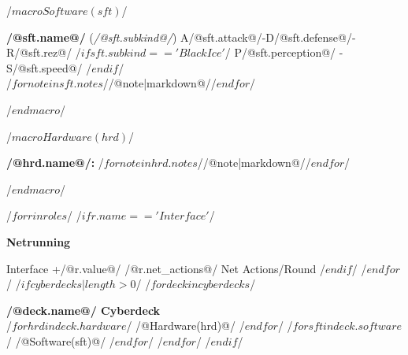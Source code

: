/$ macro Software(sft) $/
\begin{minipage}{\columnwidth}
\noindent \textbf{/@sft.name@/} (\textit{/@sft.subkind@/})
A/@sft.attack@/-D/@sft.defense@/-R/@sft.rez@/
/$ if sft.subkind == 'Black Ice' $/
P/@sft.perception@/ - S/@sft.speed@/
/$endif$/\\
/$for note in sft.notes $//@note|markdown@//$endfor$/
\end{minipage}
/$ endmacro $/

/$ macro Hardware(hrd) $/
\begin{minipage}{\columnwidth}
\noindent \textbf{/@hrd.name@/:} /$for note in hrd.notes $//@note|markdown@//$endfor$/
\end{minipage}
/$ endmacro $/

/$for r in roles$/
/$if r.name == 'Interface' $/

\vspace*{8pt}
\par\begin{nscenter}\textbf{Netrunning}\end{nscenter}
Interface +/@r.value@/ \hfill /@r.net_actions@/ Net Actions/Round
/$endif$/
/$endfor$/
/$ if cyberdecks|length > 0 $/
/$ for deck in cyberdecks $/
\vspace*{6pt}
\par\noindent\textbf{ /@deck.name@/ Cyberdeck}\\
/$ for hrd in deck.hardware $/
/@Hardware(hrd)@/
/$endfor$/
/$ for sft in deck.software $/
/@Software(sft)@/
/$endfor$/
/$ endfor $/
/$endif$/
